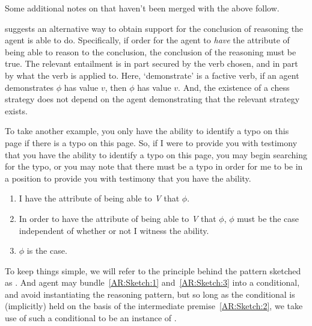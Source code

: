 \begin{note}
  {
    \color{red}
    Some additional notes on \AR{} that haven't been merged with the above follow.
  }
\end{note}

\begin{note}[Compatibility]
  \AR{} suggests an alternative way to obtain support for the conclusion of reasoning the agent is able to do.
  Specifically, if order for the agent to \emph{have} the attribute of being able to reason to the conclusion, the conclusion of the reasoning must be true.
  The relevant entailment is in part secured by the verb chosen, and in part by what the verb is applied to.
  Here, `demonstrate' is a factive verb, if an agent demonstrates \(\phi\) has value \(v\), then \(\phi\) has value \(v\).
  And, the existence of a chess strategy does not depend on the agent demonstrating that the relevant strategy exists.

  To take another example, you only have the ability to identify a typo on this page if there is a typo on this page.
  So, if I were to provide you with testimony that you have the ability to identify a typo on this page, you may begin searching for the typo, or you may note that there must be a typo in order for me to be in a position to provide you with testimony that you have the ability.
\end{note}

\begin{note}[Sketch of \AR{}]
  \begin{enumerate}[label=(\textsf{A}\arabic*), ref=(\textsf{A}\arabic*)]
  \item\label{AR:Sketch:1} I have the attribute of being able to \emph{V} that \(\phi\).
  \item\label{AR:Sketch:2} In order to have the attribute of being able to \emph{V} that \(\phi\), \(\phi\) must be the case independent of whether or not I witness the ability.
  \item\label{AR:Sketch:3} \(\phi\) is the case.
  \end{enumerate}

  To keep things simple, we will refer to the principle behind the pattern sketched as \AR{}.
  And agent may bundle~\ref{AR:Sketch:1} and~\ref{AR:Sketch:3} into a conditional, and avoid instantiating the reasoning pattern, but so long as the conditional is (implicitly) held on the basis of the intermediate premise~\ref{AR:Sketch:2}, we take use of such a conditional to be an instance of \AR{}.
\end{note}


